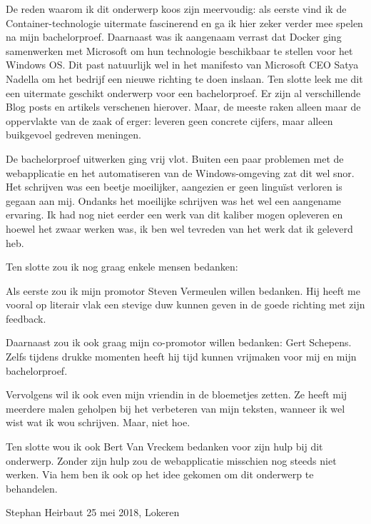 De reden waarom ik dit onderwerp koos zijn meervoudig: als eerste vind ik de Container-technologie uitermate fascinerend en ga ik hier zeker verder mee spelen na mijn bachelorproef. Daarnaast was ik aangenaam verrast dat Docker ging samenwerken met Microsoft om hun technologie beschikbaar te stellen voor het Windows OS. Dit past natuurlijk wel in het manifesto van Microsoft CEO Satya Nadella om het bedrijf een nieuwe richting te doen inslaan. Ten slotte leek me dit een uitermate geschikt onderwerp voor een bachelorproef. Er zijn al verschillende Blog posts en artikels verschenen hierover. Maar, de meeste raken alleen maar de oppervlakte van de zaak of erger: leveren geen concrete cijfers, maar alleen buikgevoel gedreven meningen.

De bachelorproef uitwerken ging vrij vlot. Buiten een paar problemen met de webapplicatie en het automatiseren van de Windows-omgeving zat dit wel snor. Het schrijven was een beetje moeilijker, aangezien er geen linguïst verloren is gegaan aan mij. Ondanks het moeilijke schrijven was het wel een aangename ervaring. Ik had nog niet eerder een werk van dit kaliber mogen opleveren en hoewel het zwaar werken was, ik ben wel tevreden van het werk dat ik geleverd heb.

Ten slotte zou ik nog graag enkele mensen bedanken:

Als eerste zou ik mijn promotor Steven Vermeulen willen bedanken. Hij heeft me vooral op literair vlak een stevige duw kunnen geven in de goede richting met zijn feedback.

Daarnaast zou ik ook graag mijn co-promotor willen bedanken: Gert Schepens. Zelfs tijdens drukke momenten heeft hij tijd kunnen vrijmaken voor mij en mijn bachelorproef.

Vervolgens wil ik ook even mijn vriendin in de bloemetjes zetten. Ze heeft mij meerdere malen geholpen bij het verbeteren van mijn teksten, wanneer ik wel wist wat ik wou schrijven. Maar, niet hoe.

Ten slotte wou ik ook Bert Van Vreckem bedanken voor zijn hulp bij dit onderwerp. Zonder zijn hulp zou de webapplicatie misschien nog steeds niet werken. Via hem ben ik ook op het idee gekomen om dit onderwerp te behandelen.

Stephan Heirbaut
25 mei 2018, Lokeren